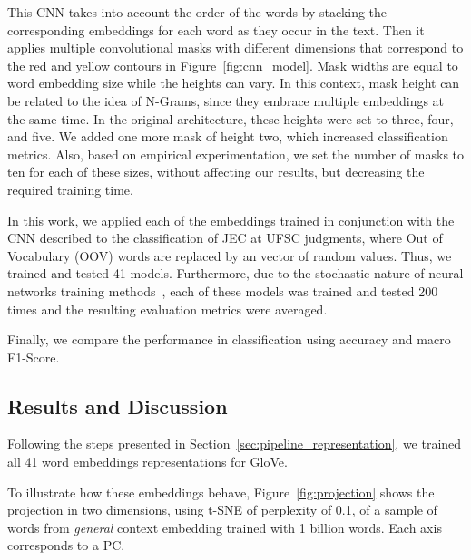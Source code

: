 This \gls{CNN} takes into account the order of the words by stacking the corresponding embeddings for each word as they occur in the text. 
Then it applies multiple convolutional masks with different dimensions that correspond to the red and yellow contours in Figure~\ref{fig:cnn_model}. Mask widths are equal to word embedding size while the heights can vary. In this context, mask height can be related to the idea of N-Grams, since they embrace multiple embeddings at the same time. 
In the original architecture, these heights were set to three, four, and five. We added one more mask of height two, which increased classification metrics. Also, based on empirical experimentation, we set  the number of masks to ten for each of these sizes, without affecting our results, but decreasing the required training time. 

In this work, we applied each of the embeddings trained in conjunction with the \gls{CNN} described to the classification of \gls{JEC} at \gls{UFSC} judgments, where Out of Vocabulary (OOV) words are replaced by an vector of random values. Thus, we trained and tested 41 models. Furthermore, due to the stochastic nature of neural networks training methods~\cite{Cohen1995}, each of these models was trained and tested 200 times and the resulting evaluation metrics were averaged. 

Finally, we compare the performance in classification using accuracy and macro F1-Score.


\subsection{Results and Discussion}

Following the steps presented in Section~\ref{sec:pipeline_representation}, we trained all 41 word embeddings representations for GloVe. 

To illustrate how these embeddings behave, Figure~\ref{fig:projection} shows the projection in two dimensions, using \gls{t-SNE} \cite{Maaten2008} of perplexity of 0.1, of a sample of words from \emph{general} context embedding trained with 1 billion words. Each axis corresponds to a \gls{PC}.

